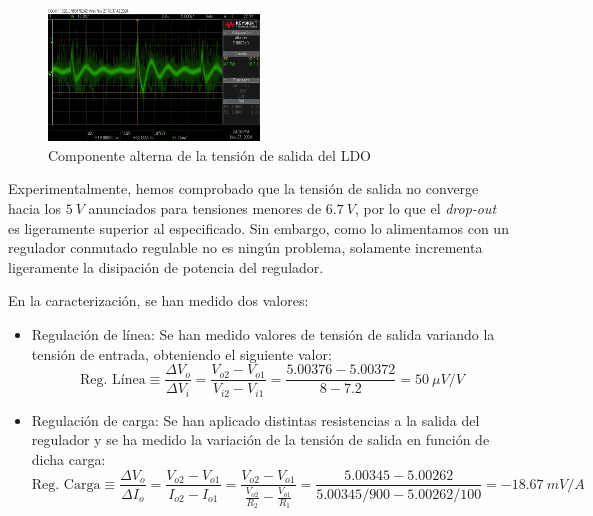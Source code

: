 \begin{figure}[H]
    \centering
    \includegraphics[width=0.5\textwidth]{images/2-hardware/componentes/ldo/picosConLDO.jpg}
    \caption{Componente alterna de la tensión de salida del LDO}
    \label{fig:hardware/modulos/ldo-sin-picos}
\end{figure}

Experimentalmente, hemos comprobado que la tensión de salida no converge hacia los $5\ V$ anunciados para tensiones menores de $6.7\ V$, por lo que el \textit{drop-out} es ligeramente superior al especificado. Sin embargo, como lo alimentamos con un regulador conmutado regulable no es ningún problema, solamente incrementa ligeramente la disipación de potencia del regulador.

En la caracterización, se han medido dos valores: \begin{itemize}
    \item Regulación de línea: Se han medido valores de tensión de salida variando la tensión de entrada, obteniendo el siguiente valor: \[ \text{Reg. Línea} \equiv \frac{\Delta V_o}{\Delta V_i} = \frac{V_{o2} - V_{o1}}{V_{i2} - V_{i1}} = \frac{5.00376 - 5.00372}{8 - 7.2} = 50\ \mu V/V \]

    \item Regulación de carga: Se han aplicado distintas resistencias a la salida del regulador y se ha medido la variación de la tensión de salida en función de dicha carga: \[ \text{Reg. Carga} \equiv \frac{\Delta V_o}{\Delta I_o} = \frac{V_{o2} - V_{o1}}{I_{o2} - I_{o1}} = \frac{V_{o2} - V_{o1}}{\frac{V_{o2}}{R_2} - \frac{V_{o1}}{R_1}} = \frac{5.00345 - 5.00262}{5.00345/900 - 5.00262/100} = -18.67\ mV/A \]
\end{itemize}